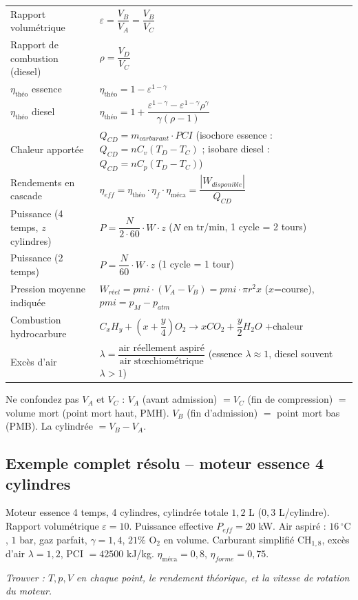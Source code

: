\begin{center}
\renewcommand{\arraystretch}{1.7}
\begin{tabularx}{\linewidth}{@{}l X@{}}
\toprule
Rapport volumétrique & $\varepsilon = \dfrac{V_B}{V_A}=\dfrac{V_B}{V_C}$ \\
Rapport de combustion (diesel) & $\rho = \dfrac{V_D}{V_C}$ \\
$\eta_{\text{théo}}$ essence & $\eta_{\text{théo}}=1-\varepsilon^{1-\gamma}$ \\
$\eta_{\text{théo}}$ diesel & $\eta_{\text{théo}}=1+\dfrac{\varepsilon^{1-\gamma}-\varepsilon^{1-\gamma}\rho^\gamma}
{\gamma(\rho-1)}$ \\
Chaleur apportée & $Q_{CD}=m_{carburant}\cdot PCI$ (isochore essence : $Q_{CD}=nC_v(T_D-T_C)$ ; isobare
diesel : $Q_{CD}=nC_p(T_D-T_C)$) \\
Rendements en cascade & $\eta_{eff}=\eta_{\text{théo}}\cdot\eta_{f}\cdot\eta_{\text{méca}}=\dfrac{|W_{disponible}|}{Q_{CD}}$ \\
Puissance (4 temps, $z$ cylindres) & $P=\dfrac{N}{2\cdot 60}\cdot W\cdot z$ \quad ($N$ en tr/min, 1 cycle =
2 tours) \\
Puissance (2 temps) & $P=\dfrac{N}{60}\cdot W\cdot z$ \quad (1 cycle = 1 tour) \\
Pression moyenne indiquée & $W_{réel}=pmi\cdot(V_A-V_B)=pmi\cdot\pi r^2 x$ ($x$=course), $pmi=p_M-p_{atm}$ \\
Combustion hydrocarbure & $C_xH_y+\left(x+\dfrac{y}{4}\right)O_2 \to xCO_2+\dfrac{y}{2}H_2O$ +chaleur \\
Excès d'air & $\lambda=\dfrac{\text{air réellement aspiré}}{\text{air stœchiométrique}}$ (essence
$\lambda\approx 1$, diesel souvent $\lambda>1$) \\
\bottomrule
\end{tabularx}
\end{center}

\begin{piege}
Ne confondez pas $V_A$ et $V_C$ : $V_A$ (avant admission) $=V_C$ (fin de compression) $=$ volume mort
(point mort haut, PMH). $V_B$ (fin d'admission) $=$ point mort bas (PMB). La cylindrée $=V_B-V_A$.
\end{piege}

\newpage
\subsection{Exemple complet résolu -- moteur essence 4 cylindres}

\begin{enonce}
Moteur essence 4 temps, 4 cylindres, cylindrée totale $1{,}2$ L ($0{,}3$ L/cylindre). Rapport volumétrique
$\varepsilon=10$. Puissance effective $P_{eff}=20$ kW. Air aspiré : $16\,^\circ\text{C}$, $1$ bar, gaz
parfait, $\gamma=1{,}4$, $21\%$ O$_2$ en volume. Carburant simplifié CH$_{1,8}$, excès d'air
$\lambda=1{,}2$, PCI $=42500$ kJ/kg. $\eta_{\text{méca}}=0{,}8$, $\eta_{forme}=0{,}75$.

\emph{Trouver : $T,p,V$ en chaque point, le rendement théorique, et la vitesse de rotation du moteur.}
\end{enonce}

